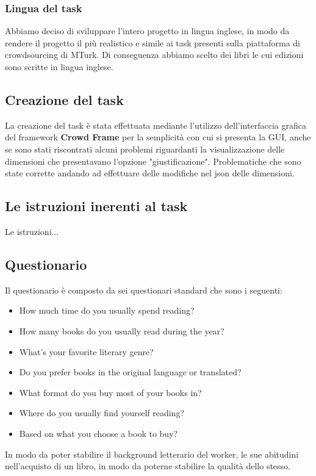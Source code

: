 \documentclass[a4paper,11pt]{report}
\begin{document}
\subsubsection{Lingua del task}
Abbiamo deciso di sviluppare l'intero progetto in lingua inglese, in modo da rendere il progetto il più realistico e simile ai task presenti sulla piattaforma di crowdsourcing di MTurk. Di conseguenza abbiamo scelto dei libri le cui edizioni sono scritte in lingua inglese.

\subsection{Creazione del task}
La creazione del task è stata effettuata mediante l'utilizzo dell'interfaccia grafica del framework \textbf{Crowd Frame} per la semplicità con cui si presenta la GUI, anche se sono stati riscontrati alcuni problemi riguardanti la visualizzazione delle dimensioni che presentavano l'opzione "giustificazione". Problematiche che sono state corrette andando ad effettuare delle modifiche nel json delle dimensioni. 


\subsection{Le istruzioni inerenti al task}
Le istruzioni... 


\begin{figure}[h]
	\centering
	\label{fig:followers}
\end{figure}

\pagebreak
\subsection{Questionario}
Il questionario è composto da sei questionari standard che sono i seguenti:
\begin{itemize}
	\item How much time do you usually spend reading?
	\item How many books do you usually read during the year?
	\item What's your favorite literary genre?
	\item Do you prefer books in the original language or translated?
	\item What format do you buy most of your books in?
	\item Where do you usually find yourself reading?
	\item Based on what you choose a book to buy?
\end{itemize}
In modo da poter stabilire il background letterario del worker, le sue abitudini nell'acquisto di un libro, in modo da poterne stabilire la qualità dello stesso.
\end{document}
